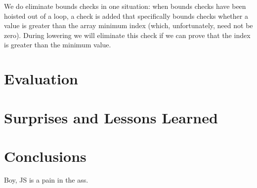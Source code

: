 \documentclass{article}
\begin{document}
We do eliminate bounds checks in one situation: when bounds checks
have been hoisted out of a loop, a check is added that specifically
bounds checks whether a value is greater than the array minimum index
(which, unfortunately, need not be zero). During lowering we will
eliminate this check if we can prove that the index is greater than
the minimum value.

\section{Evaluation}

\section{Surprises and Lessons Learned}

\section{Conclusions}
Boy, JS is a pain in the ass.

{}

\end{document}
